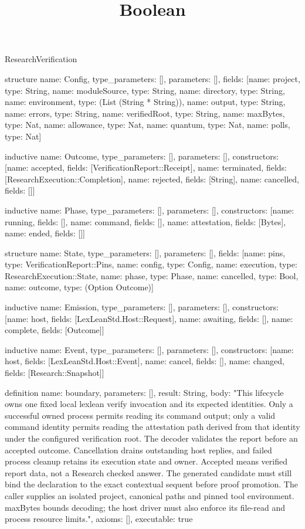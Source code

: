\begin{lexlean}{ResearchVerification}
\title{Boolean}
\begin{semanticmodule}

structure{
  name: Config,
  type_parameters: [],
  parameters: [],
  fields: [{name: project, type: String}, {name: moduleSource, type: String}, {name: directory, type: String}, {name: environment, type: (List (String * String))}, {name: output, type: String}, {name: errors, type: String}, {name: verifiedRoot, type: String}, {name: maxBytes, type: Nat}, {name: allowance, type: Nat}, {name: quantum, type: Nat}, {name: polls, type: Nat}]
}

inductive{
  name: Outcome,
  type_parameters: [],
  parameters: [],
  constructors: [{name: accepted, fields: [VerificationReport::Receipt]}, {name: terminated, fields: [ResearchExecution::Completion]}, {name: rejected, fields: [String]}, {name: cancelled, fields: []}]
}

inductive{
  name: Phase,
  type_parameters: [],
  parameters: [],
  constructors: [{name: running, fields: []}, {name: command, fields: []}, {name: attestation, fields: [Bytes]}, {name: ended, fields: []}]
}

structure{
  name: State,
  type_parameters: [],
  parameters: [],
  fields: [{name: pins, type: VerificationReport::Pins}, {name: config, type: Config}, {name: execution, type: ResearchExecution::State}, {name: phase, type: Phase}, {name: cancelled, type: Bool}, {name: outcome, type: (Option Outcome)}]
}

inductive{
  name: Emission,
  type_parameters: [],
  parameters: [],
  constructors: [{name: host, fields: [LexLeanStd.Host::Request]}, {name: awaiting, fields: []}, {name: complete, fields: [Outcome]}]
}

inductive{
  name: Event,
  type_parameters: [],
  parameters: [],
  constructors: [{name: host, fields: [LexLeanStd.Host::Event]}, {name: cancel, fields: []}, {name: changed, fields: [Research::Snapshot]}]
}

definition{
  name: boundary,
  parameters: [],
  result: String,
  body: "This lifecycle owns one fixed local lexlean verify invocation and its expected identities. Only a successful owned process permits reading its command output; only a valid command identity permits reading the attestation path derived from that identity under the configured verification root. The decoder validates the report before an accepted outcome. Cancellation drains outstanding host replies, and failed process cleanup retains its execution state and owner. Accepted means verified report data, not a Research checked answer. The generated candidate must still bind the declaration to the exact contextual sequent before proof promotion. The caller supplies an isolated project, canonical paths and pinned tool environment. maxBytes bounds decoding; the host driver must also enforce its file-read and process resource limits.",
  axioms: [],
  executable: true
}


\end{semanticmodule}
\end{lexlean}
